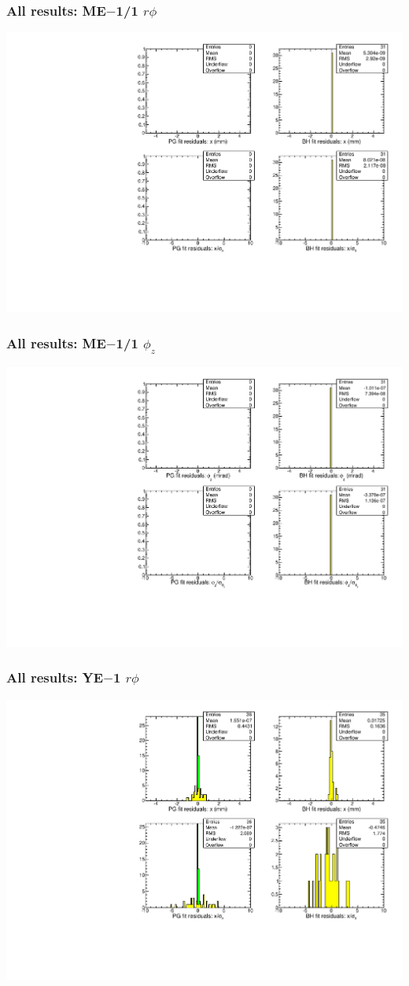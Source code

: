 \documentclass[compress]{beamer}
\begin{document}
\begin{frame}
\frametitle{All results: ME$-$1/1 $r\phi$}
\includegraphics[width=\linewidth]{newplots_fitresiduals_MEm1_1_x.pdf}
\end{frame}
\begin{frame}
\frametitle{All results: ME$-$1/1 $\phi_z$}
\includegraphics[width=\linewidth]{newplots_fitresiduals_MEm1_1_phiz.pdf}
\end{frame}
\begin{frame}
\frametitle{All results: YE$-$1 $r\phi$}
\includegraphics[width=\linewidth]{newplots_fitresiduals_YEm1_x.pdf}
\end{frame}
\end{document}

